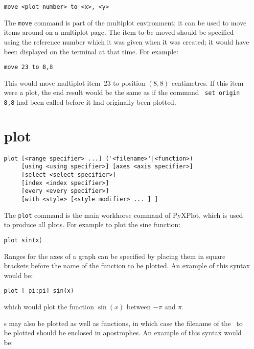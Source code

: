 \begin{verbatim}
move <plot number> to <x>, <y>
\end{verbatim}

The {\tt move} command is part of the multiplot environment; it can be used to
move items around on a multiplot page. The item to be moved should be specified
using the reference number which it was given when it was created; it would
have been displayed on the terminal at that time. For example:

\begin{verbatim}
move 23 to 8,8
\end{verbatim}
  
\noindent This would move multiplot item~23 to position $(8,8)$ centimetres. If
this item were a plot, the end result would be the same as if the command {\tt
set origin 8,8} had been called before it had originally been plotted.

\section{plot}

\begin{verbatim}
plot [<range specifier> ...] ('<filename>'|<function>)
     [using <using specifier>] [axes <axis specifier>]
     [select <select specifier>]
     [index <index specifier>]
     [every <every specifier>]
     [with <style> [<style modifier> ... ] ]
\end{verbatim}

The {\tt plot} command is the main workhorse command of PyXPlot, which is used
to produce all plots. For example to plot the sine function:

\begin{verbatim}
plot sin(x)
\end{verbatim}

Ranges for the axes of a graph can be specified by placing them in
square brackets before the name of the function to be plotted. An example of
this syntax would be:

\begin{verbatim}
plot [-pi:pi] sin(x)
\end{verbatim}

\noindent which would plot the function $\sin(x)$ between $-\pi$ and $\pi$.

\Datafile s may also be plotted as well as functions, in which case the filename
of the \datafile\ to be plotted should be enclosed in apostrophes. An example of
this syntax would be:

